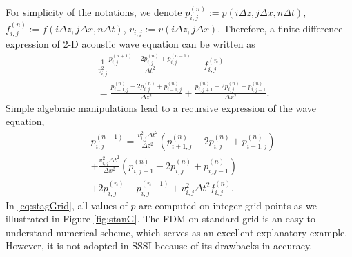 \documentclass[11pt]{article}
\theoremstyle{plain}
\theoremstyle{definition}
\theoremstyle{remark}
\numberwithin{equation}{section}
\begin{document}
For simplicity of the notations, we denote $p_{i,j}^{(n)}:=  p(i\Delta z, j\Delta x, n\Delta t)$, $f_{i,j}^{(n)} := f(i\Delta z, j\Delta x, n\Delta t)$, $v_{i,j} := v(i\Delta z, j\Delta x)$.
 Therefore, a finite difference expression of 2-D acoustic wave equation can be written as 
  \begin{equation}
    \begin{aligned}
    &\frac{1}{v_{i,j}^2}\frac{p_{i,j}^{(n+1)} - 2p_{i,j}^{(n)} + p_{i,j}^{(n-1)}}{\Delta t^2} - f_{i,j}^{(n)} \\
    &= \frac{p_{i+1,j}^{(n)} - 2p_{i,j}^{(n)} + p_{i-1,j}^{(n)}}{\Delta z^2} + \frac{p_{i,j+1}^{(n)} - 2p_{i,j}^{(n)} + p_{i,j-1}^{(n)}}{\Delta x^2}.
    \end{aligned}
  \end{equation}
Simple algebraic manipulations lead to a recursive expression of the wave equation,
  \begin{equation}
  \label{eq:stagGrid}
    \begin{aligned}
    &p_{i,j}^{(n+1)} = \frac{v_{i,j}^2\Delta t^2}{\Delta z^2}\left(p_{i+1,j}^{(n)} - 2p_{i,j}^{(n)} + p_{i-1,j}^{(n)}\right)\\
    &+ \frac{v_{i,j}^2\Delta t^2}{\Delta x^2}\left(p_{i,j+1}^{(n)} - 2p_{i,j}^{(n)} + p_{i,j-1}^{(n)}\right)\\
    &+ 2p_{i,j}^{(n)}-p_{i,j}^{(n-1)} + v_{i,j}^2\Delta t^2 f_{i,j}^{(n)}.
    \end{aligned}
  \end{equation}
  In \eqref{eq:stagGrid}, all values of $p$ are computed on integer grid points as we illustrated in Figure \ref{fig:stanG}. The FDM on standard grid is an easy-to-understand numerical scheme, which serves as an excellent explanatory example. However, it is not adopted in SSSI because of its drawbacks in accuracy.  
  
\end{document}
